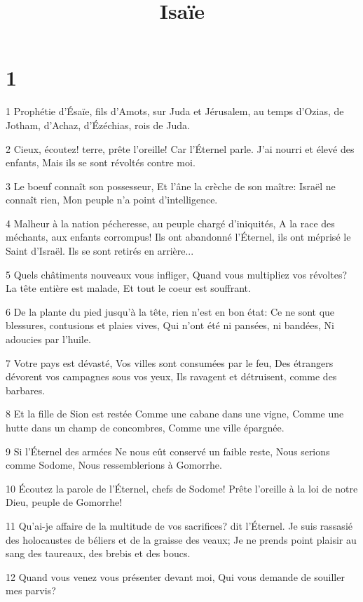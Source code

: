 

\title{Isaïe}


\chapter{1}

\par 1 Prophétie d'Ésaïe, fils d'Amots, sur Juda et Jérusalem, au temps d'Ozias, de Jotham, d'Achaz, d'Ézéchias, rois de Juda.
\par 2 Cieux, écoutez! terre, prête l'oreille! Car l'Éternel parle. J'ai nourri et élevé des enfants, Mais ils se sont révoltés contre moi.
\par 3 Le boeuf connaît son possesseur, Et l'âne la crèche de son maître: Israël ne connaît rien, Mon peuple n'a point d'intelligence.
\par 4 Malheur à la nation pécheresse, au peuple chargé d'iniquités, A la race des méchants, aux enfants corrompus! Ils ont abandonné l'Éternel, ils ont méprisé le Saint d'Israël. Ils se sont retirés en arrière...
\par 5 Quels châtiments nouveaux vous infliger, Quand vous multipliez vos révoltes? La tête entière est malade, Et tout le coeur est souffrant.
\par 6 De la plante du pied jusqu'à la tête, rien n'est en bon état: Ce ne sont que blessures, contusions et plaies vives, Qui n'ont été ni pansées, ni bandées, Ni adoucies par l'huile.
\par 7 Votre pays est dévasté, Vos villes sont consumées par le feu, Des étrangers dévorent vos campagnes sous vos yeux, Ils ravagent et détruisent, comme des barbares.
\par 8 Et la fille de Sion est restée Comme une cabane dans une vigne, Comme une hutte dans un champ de concombres, Comme une ville épargnée.
\par 9 Si l'Éternel des armées Ne nous eût conservé un faible reste, Nous serions comme Sodome, Nous ressemblerions à Gomorrhe.
\par 10 Écoutez la parole de l'Éternel, chefs de Sodome! Prête l'oreille à la loi de notre Dieu, peuple de Gomorrhe!
\par 11 Qu'ai-je affaire de la multitude de vos sacrifices? dit l'Éternel. Je suis rassasié des holocaustes de béliers et de la graisse des veaux; Je ne prends point plaisir au sang des taureaux, des brebis et des boucs.
\par 12 Quand vous venez vous présenter devant moi, Qui vous demande de souiller mes parvis?
